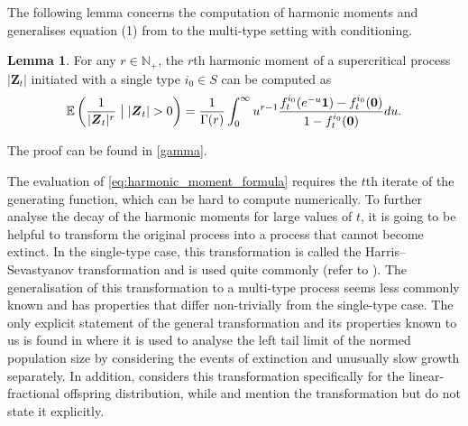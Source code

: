 \documentclass[preprint,3p,12pt]{elsarticle}
\theoremstyle{definition}
\newtheorem{lemma}{Lemma}
\begin{document}
The following lemma concerns the computation of harmonic moments and generalises equation (1) from \cite{athreya2003} to the multi-type setting with conditioning.
\begin{lemma}\label{gamma_lemma}
For any $r \in \mathbb{N}_+$, the $r$th harmonic moment of a supercritical process $|\boldsymbol{Z}_t|$ initiated with a single type $i_0 \in S$ can be computed as
\begin{equation}
 \mathbb{E}\left(\frac{1}{|\boldsymbol{Z}_t|^r} \bigm| |\boldsymbol{Z}_t| > 0\right) = \frac{1}{\Gamma(r)}\int_0^{\infty} u^{r-1} \frac{f_t^{i_0}(e^{-u}\boldsymbol{1}) - f_t^{i_0}(\boldsymbol{0})}{1-f_t^{i_0}(\boldsymbol{0})} du  \label{eq:harmonic_moment_formula}.
\end{equation}
\end{lemma}
The proof can be found in \ref{gamma}.

The evaluation of \eqref{eq:harmonic_moment_formula} requires the $t$th iterate of the generating function, which can be hard to compute numerically. To further analyse the decay of the harmonic moments for large values of $t$, it is going to be helpful to transform the original process into a process that cannot become extinct. In the single-type case, this transformation is called the Harris--Sevastyanov transformation and is used quite commonly (refer to \cite{harris1948, Bingham_1988}). The generalisation of this transformation to a multi-type process seems less commonly known and has properties that differ non-trivially from the single-type case. The only explicit statement of the general transformation and its properties known to us is found in \cite{jones} where it is used to analyse the left tail limit of the normed population size by considering the events of extinction and unusually slow growth separately. In addition, \cite{sagitov2013} considers this transformation specifically for the linear-fractional offspring distribution, while \cite{hs_mention} and \cite{hs_mention2} mention the transformation but do not state it explicitly.
\end{document}

